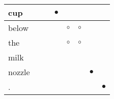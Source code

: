 \documentclass[landscape]{article}
\newcommand{\ssp}{\hspace{2pt}}
\newcommand{\mex}{\cellcolor{g}$\bullet$}
\newcommand{\map}{\cellcolor{y}$\boldsymbol\circ$}
\begin{document}
\begin{tabular}{|l|p{10pt}|p{10pt}|p{10pt}|p{10pt}|p{10pt}|p{10pt}|p{10pt}|}
\hline
\ssp \cellcolor{ref2}cup \ssp&\hspace{2pt}&\hspace{2pt}&\hspace{2pt}\mex&\hspace{2pt}&\hspace{2pt}&\hspace{2pt}&\hspace{2pt}\\
\hline
\ssp \cellcolor{ref3}below \ssp&\hspace{2pt}&\hspace{2pt}&\hspace{2pt}&\hspace{2pt}\map&\hspace{2pt}\map&\hspace{2pt}&\hspace{2pt}\\
\hline
\ssp \cellcolor{ref3}the \ssp&\hspace{2pt}&\hspace{2pt}&\hspace{2pt}&\hspace{2pt}\map&\hspace{2pt}\map&\hspace{2pt}&\hspace{2pt}\\
\hline
\ssp milk \ssp&\hspace{2pt}&\hspace{2pt}&\hspace{2pt}&\hspace{2pt}&\hspace{2pt}&\hspace{2pt}&\hspace{2pt}\\
\hline
\ssp \cellcolor{ref5}nozzle \ssp&\hspace{2pt}&\hspace{2pt}&\hspace{2pt}&\hspace{2pt}&\hspace{2pt}&\hspace{2pt}\mex&\hspace{2pt}\\
\hline
\ssp \cellcolor{ref6}. \ssp&\hspace{2pt}&\hspace{2pt}&\hspace{2pt}&\hspace{2pt}&\hspace{2pt}&\hspace{2pt}&\hspace{2pt}\mex\\
\hline
\end{tabular}
\end{document}
